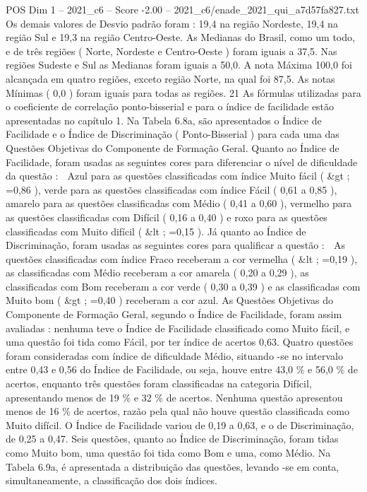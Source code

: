 \begin{textsample}{POS Dim 1 – 2021\_c6 – Score -2.00 – 2021\_c6/enade\_2021\_qui\_a7d57fa827.txt}
Os demais valores de Desvio padrão foram : 19,4 na região Nordeste, 19,4 na região Sul e 19,3 na região Centro-Oeste.
As Medianas do Brasil, como um todo, e de três regiões ( Norte, Nordeste e Centro-Oeste ) foram iguais a 37,5.
Nas regiões Sudeste e Sul as Medianas foram iguais a 50,0.
A nota Máxima 100,0 foi alcançada em quatro regiões, exceto região Norte, na qual foi 87,5.
As notas Mínimas ( 0,0 ) foram iguais para todas as regiões. 21 As fórmulas utilizadas para o coeficiente de correlação ponto-bisserial e para o índice de facilidade estão apresentadas no capítulo 1.
Na Tabela 6.8a, são apresentados o Índice de Facilidade e o Índice de Discriminação ( Ponto-Bisserial ) para cada uma das Questões Objetivas do Componente de Formação Geral.
Quanto ao Índice de Facilidade, foram usadas as seguintes cores para diferenciar o nível de dificuldade da questão :  Azul para as questões classificadas com índice Muito fácil ( \&gt ; =0,86 ), verde para as questões classificadas com índice Fácil ( 0,61 a 0,85 ), amarelo para as questões classificadas com Médio ( 0,41 a 0,60 ), vermelho para as questões classificadas com Difícil ( 0,16 a 0,40 ) e roxo para as questões classificadas com Muito difícil ( \&lt ; =0,15 ).
Já quanto ao Índice de Discriminação, foram usadas as seguintes cores para qualificar a questão :  As questões classificadas com índice Fraco receberam a cor vermelha ( \&lt ; =0,19 ), as classificadas com Médio receberam a cor amarela ( 0,20 a 0,29 ), as classificadas com Bom receberam a cor verde ( 0,30 a 0,39 ) e as classificadas com Muito bom ( \&gt ; =0,40 ) receberam a cor azul.
As Questões Objetivas do Componente de Formação Geral, segundo o Índice de Facilidade, foram assim avaliadas : nenhuma teve o Índice de Facilidade classificado como Muito fácil, e uma questão foi tida como Fácil, por ter índice de acertos 0,63.
Quatro questões foram consideradas com índice de dificuldade Médio, situando -se no intervalo entre 0,43 e 0,56 do Índice de Facilidade, ou seja, houve entre 43,0 \% e 56,0 \% de acertos, enquanto três questões foram classificadas na categoria Difícil, apresentando menos de 19 \% e 32 \% de acertos.
Nenhuma questão apresentou menos de 16 \% de acertos, razão pela qual não houve questão classificada como Muito difícil.
O Índice de Facilidade variou de 0,19 a 0,63, e o de Discriminação, de 0,25 a 0,47.
Seis questões, quanto ao Índice de Discriminação, foram tidas como Muito bom, uma questão foi tida como Bom e uma, como Médio.
Na Tabela 6.9a, é apresentada a distribuição das questões, levando -se em conta, simultaneamente, a classificação dos dois índices.

\end{textsample}
